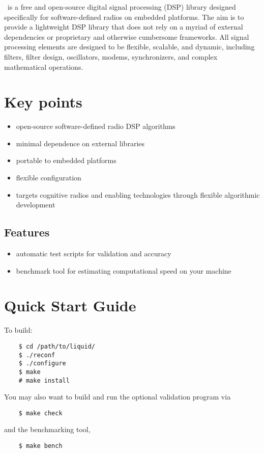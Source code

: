 %
%

\liquid\ is a free and open-source digital signal processing (DSP) library
designed specifically for software-defined radios on embedded platforms.
The aim is to provide a lightweight DSP library that does not rely on a myriad
of external dependencies or proprietary and otherwise cumbersome frameworks.
All signal processing elements are designed to be flexible, scalable, and
dynamic, including filters, filter design, oscillators, modems, synchronizers,
and complex mathematical operations.

\section{Key points}
\begin{itemize}
\item open-source software-defined radio DSP algorithms
\item minimal dependence on external libraries
\item portable to embedded platforms
\item flexible configuration
\item targets cognitive radios and enabling technologies through
      flexible algorithmic development
\end{itemize}

\subsection{Features}
\begin{itemize}
\item automatic test scripts for validation and accuracy
\item benchmark tool for estimating computational speed on your machine
\end{itemize}


\section{Quick Start Guide}
To build:
\begin{verbatim}
    $ cd /path/to/liquid/
    $ ./reconf
    $ ./configure
    $ make
    # make install
\end{verbatim}
You may also want to build and run the optional validation program via
\begin{verbatim}
    $ make check
\end{verbatim}
and the benchmarking tool,
\begin{verbatim}
    $ make bench
\end{verbatim}

